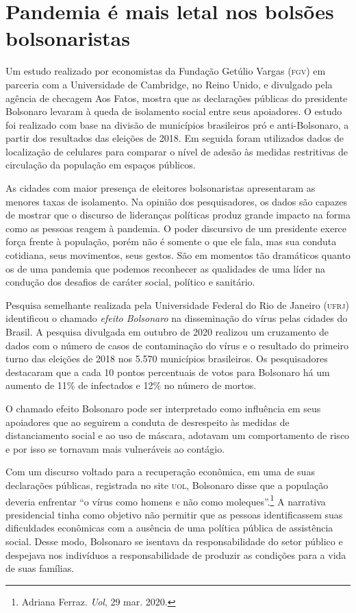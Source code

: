 \section{Pandemia é mais letal nos bolsões bolsonaristas}

Um estudo realizado por economistas da Fundação Getúlio Vargas (\textsc{fgv}) em
parceria com a Universidade de Cambridge, no Reino Unido, e divulgado
pela agência de checagem Aos Fatos, mostra que as declarações públicas
do presidente Bolsonaro levaram à queda de isolamento social entre seus
apoiadores. O estudo foi realizado com base na divisão 
de municípios brasileiros pró e anti-Bolsonaro, a partir dos resultados
das eleições de 2018. Em seguida foram utilizados dados de localização
de celulares para comparar o nível de adesão às medidas restritivas de
circulação da população em espaços públicos.%

As cidades com maior presença de eleitores bolsonaristas apresentaram as
menores taxas de isolamento. Na opinião dos pesquisadores, os dados são
capazes de mostrar que o discurso de lideranças políticas produz grande
impacto na forma como as pessoas reagem à pandemia. O poder discursivo
de um presidente exerce força frente à população, porém não é somente o
que ele fala, mas sua conduta cotidiana, seus movimentos, seus gestos.
São em momentos tão dramáticos quanto os de uma pandemia que podemos
reconhecer as qualidades de uma líder na condução dos desafios de
caráter social, político e sanitário.

Pesquisa semelhante realizada pela Universidade Federal do Rio de
Janeiro (\textsc{ufrj}) identificou o chamado \textit{efeito Bolsonaro} na
disseminação do vírus pelas cidades do Brasil. A pesquisa divulgada em
outubro de 2020 realizou um cruzamento de dados com o número de casos de
contaminação do vírus e o resultado do primeiro turno das eleições de 2018
nos 5.570 municípios brasileiros. Os pesquisadores destacaram que a cada
10 pontos percentuais de votos para Bolsonaro há um aumento de 11\% de
infectados e 12\% no número de mortos.

O chamado efeito Bolsonaro pode ser interpretado como influência em seus
apoiadores que ao seguirem a conduta de desrespeito às medidas de
distanciamento social e ao uso de máscara, adotavam um comportamento de
risco e por isso se tornavam mais vulneráveis ao contágio.

Com um discurso voltado para a recuperação econômica, em uma de suas
declarações públicas, registrada no site \textsc{uol}, Bolsonaro disse que a
população deveria enfrentar ``o vírus como homens e não como moleques''.\footnote{Adriana Ferraz. \textit{Uol}, 29 mar. 2020.}
A narrativa presidencial tinha como objetivo não
permitir que as pessoas identificassem suas dificuldades econômicas com
a ausência de uma política pública de assistência social. Desse modo,
Bolsonaro se isentava da responsabilidade do setor público e despejava
nos indivíduos a responsabilidade de produzir as condições para a vida
de suas famílias.

